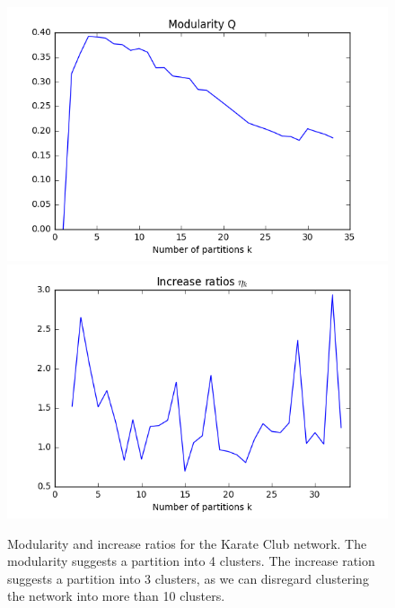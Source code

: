 \documentclass[12pt]{article}
\theoremstyle{definition}
\begin{document}
\begin{figure}[h]
	\includegraphics[scale=0.44]{karate_graph_Q}
	\includegraphics[scale=0.44]{karate_graph_eta}
	\centering
	\caption{Modularity and increase ratios for the Karate Club network. The modularity suggests a partition into 4 clusters. The increase ration suggests a partition into 3 clusters, as we can disregard clustering the network into more than 10 clusters.}
	\label{fig_karate_eval}
\end{figure}
\end{document}

